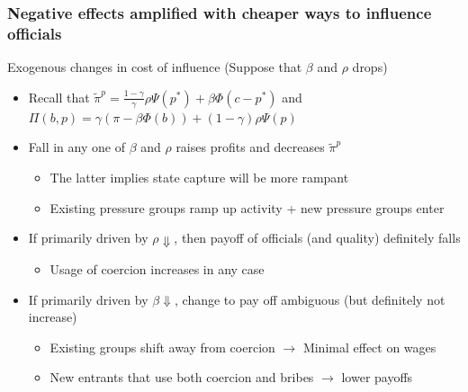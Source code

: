 \documentclass[aspectratio=169]{beamer}
\begin{document}
\begin{frame}
\frametitle{Negative effects amplified with cheaper ways to influence officials} 
Exogenous changes in cost of influence (Suppose that $\beta$ and $\rho$ drops)
\begin{itemize}\setlength\itemsep{3pt}
\item Recall that $\tilde{\pi}^p=\frac{1-\gamma}{\gamma}\rho\Psi(p^*)+\beta\Phi(c-p^*)$ and $\Pi(b,p)=\gamma(\pi-\beta\Phi(b))+(1-\gamma)\rho\Psi(p)$
\item Fall in any one of $\beta$  and $\rho$ raises profits and decreases $\tilde{\pi}^p$
\begin{itemize}\setlength\itemsep{3pt}
\item The latter implies state capture will be more rampant 
\item Existing pressure groups ramp up activity + new pressure groups enter
\end{itemize}
\item If primarily driven by $\rho\Downarrow$, then payoff of officials (and quality) definitely falls
 \begin{itemize}\setlength\itemsep{3pt}
\item Usage of coercion increases in any case
\end{itemize}
\item If primarily driven by $\beta\Downarrow$, change to pay off ambiguous (but definitely not increase)
 \begin{itemize}\setlength\itemsep{3pt}
\item Existing groups shift away from coercion $\to$ Minimal effect on wages
\item New entrants that use both coercion and bribes $\to$ lower payoffs

\end{itemize}
\end{itemize}
\end{frame}
\end{document}
